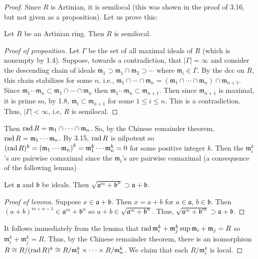 \begin{proof}
Since $R$ is Artinian, it is semilocal (this was shown in the proof
of 3.16, but not given as a proposition). Let us prove this:
\begin{proposition*}
Let $R$ be an Artinian ring. Then $R$ is semilocal.
\end{proposition*}
\begin{proof}[Proof of proposition]
\renewcommand\qedsymbol{$\clubsuit$}
Let $\Gamma$ be the set of all maximal ideals of $R$ (which is
nonempty by 1.4). Suppose, towards a contradiction, that
$|\Gamma|=\infty$ and consider the descending chain of ideals
$\mathfrak{m}_1\supset\mathfrak{m}_1\cap\mathfrak{m}_2\supset\cdots$
where $\mathfrak{m}_i\in\Gamma$. By the dcc on $R$, this chain
stabilizes for some $n$, i.e.,
$\mathfrak{m}_1\cap\cdots\cap\mathfrak{m}_n=\left(\mathfrak{m}_1\cap\cdots\cap\mathfrak{m}_n\right)\cap\mathfrak{m}_{n+1}$. Since
$\mathfrak{m}_1\cdots\mathfrak{m}_n\subset\mathfrak{m}_1\cap\cdots\cap\mathfrak{m}_n$
then
$\mathfrak{m}_1\cdots\mathfrak{m}_n\subset\mathfrak{m}_{n+1}$. Then
since $\mathfrak{m}_{n+1}$ is maximal, it is prime so, by 1.8,
$\mathfrak{m}_i\subset\mathfrak{m}_{n+1}$ for some $1\leq i\leq
n$. This is a contradiction. Thus, $|\Gamma|<\infty$, i.e, $R$ is
semilocal.
\end{proof}
Then $\operatorname{rad} R=\mathfrak{m}_1\cap\cdots\cap\mathfrak{m}_n$. So, by
the Chinese remainder theorem, $\operatorname{rad}
R=\mathfrak{m}_1\cdots\mathfrak{m}_n$. By 3.15, $\operatorname{rad} R$ is
nilpotent so $(\operatorname{rad}
R)^k=\left(\mathfrak{m}_1\cdots\mathfrak{m}_n\right)^k=\mathfrak{m}_1^k\cdots\mathfrak{m}_n^k=0$
for some positive integer $k$. Then the $\mathfrak{m}_i^k$'s are
pairwise comaximal since the $\mathfrak{m}_i$'s are pairwise
comaximal (a consequence of the following lemma)
\begin{lemma*}
Let $\mathfrak{a}$ and $\mathfrak{b}$ be ideals. Then
$\sqrt{\mathfrak{a}^m+\mathfrak{b}^n}\supset\mathfrak{a}+\mathfrak{b}$.
\end{lemma*}
\begin{proof}[Proof of lemma]
\renewcommand\qedsymbol{$\clubsuit$}
Suppose $x\in\mathfrak{a}+\mathfrak{b}$. Then $x=a+b$ for
$a\in\mathfrak{a}$, $b\in\mathfrak{b}$. Then
$(a+b)^{m+n-1}\in\mathfrak{a}^m+\mathfrak{b}^n$ so
$a+b\in\sqrt{\mathfrak{a}^m+\mathfrak{b}^n}$. Thus,
$\sqrt{\mathfrak{a}^m+\mathfrak{b}^m}\supset\mathfrak{a}+\mathfrak{b}$.
\end{proof}
It follows immediately from the lemma that
$\operatorname{rad}{\mathfrak{m}_i^k+\mathfrak{m}_j^k}\sup\mathfrak{m}_i+\mathfrak{m}_j=R$
so $\mathfrak{m}_i^k+\mathfrak{m}_j^k=R$. Thus, by the Chinese
remainder theorem, there is an isomorphism $R\cong R/(\operatorname{rad}
R)^k\cong R/\mathfrak{m}_1^k\times\cdots\times
R/\mathfrak{m}_n^k$. We claim that each $R/\mathfrak{m}_i^k$ is
local.


\end{proof}
